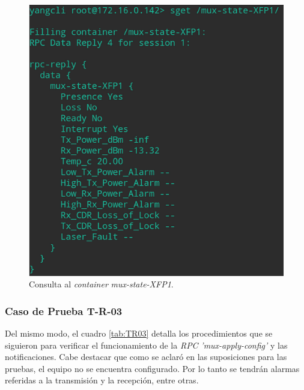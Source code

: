   \begin{figure}[H]
	\centering
	\includegraphics[scale=0.6]{Figures/test2_consulta.png}
	\caption{Consulta al \textit{container} \textit{mux-state-XFP1}.}
	\label{fig:test2_consulta}
  \end{figure}


  \subsubsection{Caso de Prueba T-R-03}
  Del mismo modo, el cuadro \ref{tab:TR03} detalla los procedimientos que se siguieron para verificar el funcionamiento de la \textit{RPC} \textit{'mux-apply-config'} y las notificaciones. Cabe destacar que como se aclaró en las suposiciones para las pruebas, el equipo no se encuentra configurado. Por lo tanto se tendrán alarmas referidas a la transmisión y la recepción, entre otras. 


